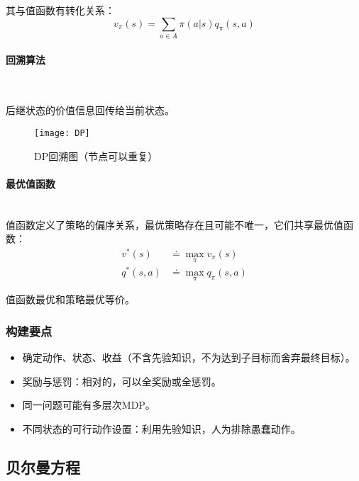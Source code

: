 \documentclass[
12pt, %
a4paper, 
oneside, %
headinclude,footinclude, %
]{scrartcl}
\begin{document}
其与值函数有转化关系：
$$ v_\pi(s) = \sum_{a \in A} \pi(a|s) q_\pi(s, a) $$
\paragraph{回溯算法}~\\
\begin{minipage}{0.3\textwidth}
\hspace{2em}
后继状态的价值信息回传给当前状态。
\end{minipage}
\hfill
\begin{minipage}{0.6\textwidth}
\begin{figure}[H]
\centering 
\texttt{[image: DP]} 
\caption[DP回溯图]{DP回溯图（节点可以重复）}
\end{figure}
\end{minipage}
\paragraph{最优值函数}~\\

值函数定义了策略的偏序关系，最优策略存在且可能不唯一，它们共享最优值函数：
\begin{align*}
v^*(s) &\doteq \max_{\pi} v_{\pi}(s) \\
q^*(s, a) &\doteq \max_{\pi} q_{\pi}(s, a) 
\end{align*}

值函数最优和策略最优等价。
\subsubsection{构建要点}
\begin{itemize}
\item 确定动作、状态、收益（不含先验知识，不为达到子目标而舍弃最终目标）。
\item 奖励与惩罚：相对的，可以全奖励或全惩罚。
\item 同一问题可能有多层次MDP。
\item 不同状态的可行动作设置：利用先验知识，人为排除愚蠢动作。
\end{itemize}
\subsection{贝尔曼方程}
\end{document}
